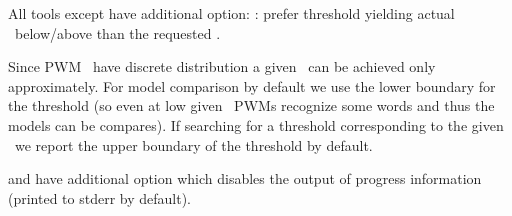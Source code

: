 All tools except  have additional option:
: prefer threshold yielding actual \pvalue\ below/above than 
the requested \pvalue.

Since PWM \pvalues\ have discrete distribution a given \pvalue\ can be achieved only 
approximately. For model comparison by default we use the lower boundary for the threshold 
(so even at low given \pvalues\ PWMs recognize some words and thus the models can be 
compares). If searching for a threshold corresponding to the given \pvalue\ we report the upper 
boundary of the threshold by default.

 and  have additional option  which 
disables the output of progress information (printed to stderr by default).

